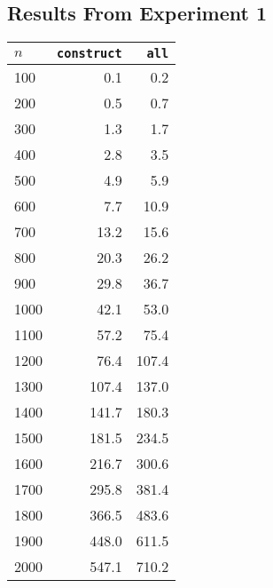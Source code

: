 \subsection{Results From Experiment 1}
\label{app:exp1}
\begin{tabular}{lrr}
     $n$ & \texttt{construct} & \texttt{all} \\ \hline
     100 &   0.1              &   0.2 \\
     200 &   0.5              &   0.7 \\
     300 &   1.3              &   1.7 \\
     400 &   2.8              &   3.5 \\
     500 &   4.9              &   5.9 \\
     600 &   7.7              &  10.9 \\
     700 &  13.2              &  15.6 \\
     800 &  20.3              &  26.2 \\
     900 &  29.8              &  36.7 \\
    1000 &  42.1              &  53.0 \\
    1100 &  57.2              &  75.4 \\
    1200 &  76.4              & 107.4 \\
    1300 & 107.4              & 137.0 \\
    1400 & 141.7              & 180.3 \\
    1500 & 181.5              & 234.5 \\
    1600 & 216.7              & 300.6 \\
    1700 & 295.8              & 381.4 \\
    1800 & 366.5              & 483.6 \\
    1900 & 448.0              & 611.5 \\
    2000 & 547.1              & 710.2
\end{tabular}

